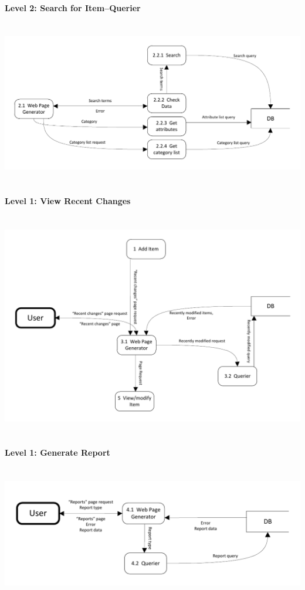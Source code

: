 \documentclass{article}
\begin{document}
\paragraph{Level 2: Search for Item--Querier}
~\\
\includegraphics[keepaspectratio, width=6.5in]{dfd_level2_search_for_item_querier.pdf}\\
~\\

\paragraph{Level 1: View Recent Changes}
~\\
\includegraphics[keepaspectratio, width=6.5in]{dfd_level1_view_recent_changes.pdf}\\
~\\

\paragraph{Level 1: Generate Report}
~\\
\includegraphics[keepaspectratio, width=6.5in]{dfd_level1_generate_report.pdf}\\
~\\
\end{document}

